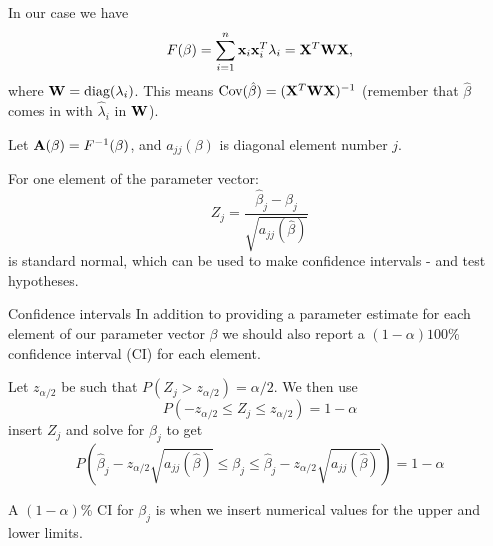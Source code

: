 \documentclass[
  ignorenonframetext,
]{beamer}
\begin{document}
\begin{frame}
In our case we have
\[F(\beta)=\sum_{i=1}^n {\bf x}_i{\bf x}_i^T \lambda_i={\bf X}^T {\bf W} {\bf X},\]
where \({\bf W}=\text{diag}(\lambda_i)\). This means
\(\text{Cov}(\hat{\beta})=({\bf X}^T {\bf W} {\bf X})^{-1}\) (remember
that \(\hat{\beta}\) comes in with \(\hat{\lambda}_i\) in \({\bf W}\)).

Let \({\bf A}(\beta)=F^{-1}(\beta)\), and \(a_{jj}(\beta)\) is diagonal
element number \(j\).

For one element of the parameter vector:
\[ Z_j=\frac{\hat{\beta}_j-\beta_j}{\sqrt{a_{jj}(\hat{\beta})}}\] is
standard normal, which can be used to make confidence intervals - and
test hypotheses.
\end{frame}

\begin{frame}
\begin{block}{Confidence intervals}
\label{confidence-intervals}
In addition to providing a parameter estimate for each element of our
parameter vector \(\beta\) we should also report a \((1-\alpha)100\)\%
confidence interval (CI) for each element.

Let \(z_{\alpha/2}\) be such that \(P(Z_j>z_{\alpha/2})=\alpha/2\). We
then use \[ P(-z_{\alpha/2}\le Z_j \le z_{\alpha/2})=1-\alpha\] insert
\(Z_j\) and solve for \(\beta_j\) to get
\[ P(\hat{\beta}_j-z_{\alpha/2}\sqrt{a_{jj}(\hat{\beta})}
\le \beta_j \le \hat{\beta}_j-z_{\alpha/2}\sqrt{a_{jj}(\hat{\beta})})=1-\alpha\]

A \((1-\alpha)\)\% CI for \(\beta_j\) is when we insert numerical values
for the upper and lower limits.
\end{block}
\end{frame}
\end{document}
